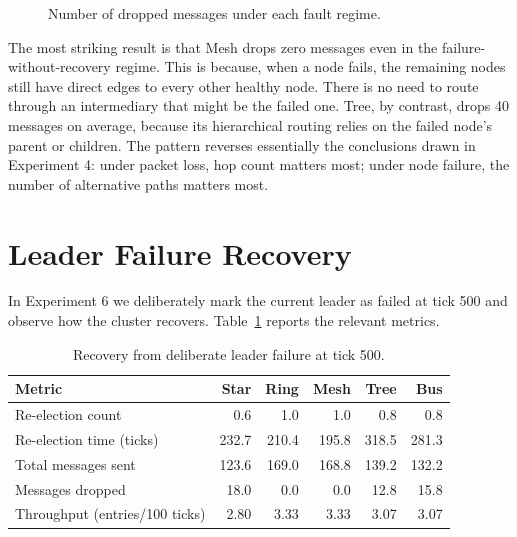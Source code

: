 \begin{figure}[H]
\centering
{}
\caption{Number of dropped messages under each fault regime.}
\label{fig:exp5_dropped}
\end{figure}

The most striking result is that Mesh drops zero messages even in the failure-without-recovery regime. This is because, when a node fails, the remaining nodes still have direct edges to every other healthy node. There is no need to route through an intermediary that might be the failed one. Tree, by contrast, drops 40 messages on average, because its hierarchical routing relies on the failed node's parent or children. The pattern reverses essentially the conclusions drawn in Experiment 4: under packet loss, hop count matters most; under node failure, the number of alternative paths matters most.

\section{Leader Failure Recovery}

In Experiment 6 we deliberately mark the current leader as failed at tick 500 and observe how the cluster recovers. Table~\ref{tab:exp6} reports the relevant metrics.

\begin{table}[H]
\centering
\caption{Recovery from deliberate leader failure at tick 500.}
\label{tab:exp6}
\begin{tabular}{lrrrrr}
\toprule
\textbf{Metric} & \textbf{Star} & \textbf{Ring} & \textbf{Mesh} & \textbf{Tree} & \textbf{Bus} \\
\midrule
Re-election count            & 0.6   & 1.0   & 1.0   & 0.8   & 0.8   \\
Re-election time (ticks)     & 232.7 & 210.4 & 195.8 & 318.5 & 281.3 \\
Total messages sent          & 123.6 & 169.0 & 168.8 & 139.2 & 132.2 \\
Messages dropped             & 18.0  & 0.0   & 0.0   & 12.8  & 15.8  \\
Throughput (entries/100 ticks)& 2.80 & 3.33  & 3.33  & 3.07  & 3.07  \\
\bottomrule
\end{tabular}
\end{table}

